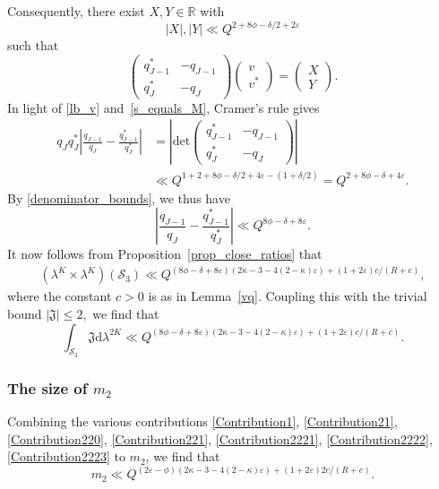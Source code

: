 \documentclass[12pt, reqno]{amsart}
\theoremstyle{definition}
\theoremstyle{remark}
\numberwithin{equation}{section}
\def\kap{{\kappa}}
\def\eps{\varepsilon}
\def\le{\leqslant} \def\ge{\geqslant}
\def \bR {\mathbb R}
\def \fJ {\mathfrak J}
\def \cS {\mathcal S}
\def \dd {\mathrm d}
\begin{document}
Consequently, there exist $X, Y \in \bR$ with 
\[
|X|,|Y| \ll Q^{2+8\phi-\delta/2+2\varepsilon}
\]
such that
\begin{equation} \label{s_equals_M}
\begin{pmatrix}
q_{J-1}^* & - q_{J-1}\\
q_J^* & - q_J
\end{pmatrix} \begin{pmatrix}
v\\v^*
\end{pmatrix}
= \begin{pmatrix}
X\\Y
\end{pmatrix}.
\end{equation}
In light of \eqref{lb_v} and~\eqref{s_equals_M}, Cramer's rule gives
\begin{align*} 
q_Jq_J^*\left|\frac{q_{J-1}}{q_J}-\frac{q_{J-1}^*}{q_J^*}\right| &= \left|\mathrm{det}\begin{pmatrix}
q_{J-1}^* & - q_{J-1} \\
q_J^* & - q_J\end{pmatrix}\right| \nonumber \\ &\ll Q^{1+2+8\phi-\delta/2+4\varepsilon-(1+\delta/2)}=Q^{2+8\phi-\delta+4\varepsilon}.
\end{align*}
By \eqref{denominator_bounds}, we thus have
\[ 
\left|\frac{q_{J-1}}{q_J}-\frac{q_{J-1}^*}{q_J^*}\right|\ll Q^{8\phi-\delta+8\varepsilon}. 
\]
It now follows from Proposition~\ref{prop_close_ratios}
that 
\begin{align*}
(\lambda^K\times \lambda^K)
(\cS_3) \ll Q^{(8\phi-\delta+8\varepsilon)(2\kappa-3-4(2-\kap)\varepsilon)+(1+2\varepsilon)c/(R+c)},  
\end{align*}
where the constant $c>0$ is as in Lemma~\ref{vq}. Coupling this with the trivial bound $|\fJ| \le 2,$ we find that 
\begin{equation}
\label{Contribution2223}
\int_{\cS_3} \fJ \dd \lambda^{2K} \ll Q^{(8\phi-\delta+8\varepsilon)(2\kappa-3-4(2-\kap)\varepsilon)+(1+2\varepsilon)c/(R+c)}. 
\end{equation}

\subsubsection{The size of $m_2$} 

Combining the various contributions \eqref{Contribution1}, \eqref{Contribution21}, \eqref{Contribution220}, \eqref{Contribution221},
\eqref{Contribution2221},
\eqref{Contribution2222},
\eqref{Contribution2223}
to $m_2$, we find that 
\[  
m_2 \ll  Q^{(2\eps - \phi)
(2 \kap - 3 - 4(2-\kap)\eps)
+ (1 + 2\eps) 2c / (R+c)}.  
\]
\end{document}
